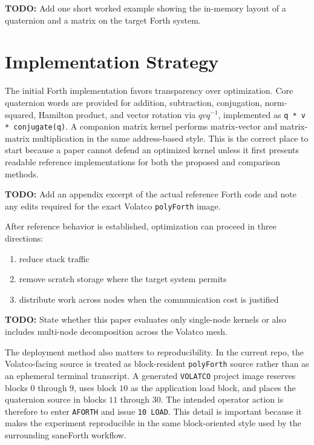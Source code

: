 \documentclass[11pt]{article}
\newcommand{\todoitem}[1]{%
  \par\noindent\textbf{TODO:} #1\par
}
\begin{document}
\todoitem{Add one short worked example showing the in-memory layout of a
quaternion and a matrix on the target Forth system.}

\section{Implementation Strategy}

The initial Forth implementation favors transparency over optimization. Core
quaternion words are provided for addition, subtraction, conjugation,
norm-squared, Hamilton product, and vector rotation via
$qvq^{-1}$, implemented as \texttt{q * v * conjugate(q)}. A companion matrix
kernel performs matrix-vector and matrix-matrix multiplication in the same
address-based style. This is the correct place to start because a paper cannot
defend an optimized kernel unless it first presents readable reference
implementations for both the proposed and comparison methods.

\todoitem{Add an appendix excerpt of the actual reference Forth code and note
any edits required for the exact Volatco \texttt{polyForth} image.}

After reference behavior is established, optimization can proceed in three
directions:

\begin{enumerate}[label=\arabic*.]
\item reduce stack traffic
\item remove scratch storage where the target system permits
\item distribute work across nodes when the communication cost is justified
\end{enumerate}

\todoitem{State whether this paper evaluates only single-node kernels or also
includes multi-node decomposition across the Volatco mesh.}

The deployment method also matters to reproducibility. In the current repo, the
Volatco-facing source is treated as block-resident \texttt{polyForth} source
rather than as an ephemeral terminal transcript. A generated \texttt{VOLATCO}
project image reserves blocks $0$ through $9$, uses block $10$ as the
application load block, and places the quaternion source in blocks $11$ through
$30$. The intended operator action is therefore to enter \texttt{AFORTH} and
issue \texttt{10 LOAD}. This detail is important because it makes the
experiment reproducible in the same block-oriented style used by the surrounding
saneForth workflow.
\end{document}
